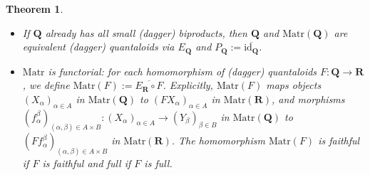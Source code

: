 \documentclass[12pt]{tac}
\newtheorem{theorem}{Theorem}[section]
\theoremstyle{definition}
\theoremstyle{remark}
\newcommand{\<}{\langle}
\renewcommand{\>}{\rangle}
\renewcommand{\:}{\colon}
\newcommand{\id}{\mathrm{id}}
\begin{document}
\begin{theorem}
\begin{itemize}
    the following diagram commutes up to natural isomorphism:
 \[ \begin{tikzcd}
 \mathbf Q\ar{r}{E_\mathbf Q}\ar{dr}[swap]{F} & \mathrm{Matr}(\mathbf Q)\ar{d}{\overline F}
  \\
  & \mathbf R,
\end{tikzcd} \]
 namely the functor that maps any object $(X_\alpha)_{\alpha\in A}$ in $\mathrm{Matr}(\mathbf Q)$ to $\bigoplus_{\alpha\in A}X_\alpha$ in $\mathbf{R}$ and that maps morphisms $(f_\alpha^\beta)_{(\alpha,\beta)\in A\times B}:(X_\alpha)_{\alpha\in A}\to(Y_\beta)_{\beta\in B}$ to $\bigvee_{\alpha\in A,\beta\in B}i_{Y_\beta}\circ f_\alpha^\beta\circ p_{X_\alpha}$.
    \item If $\mathbf Q$ already has all small (dagger) biproducts, then $\mathbf Q$ and $\mathrm{Matr}(\mathbf Q)$ are equivalent (dagger) quantaloids via $E_\mathbf Q$ and $P_{\mathbf Q}:=\overline{\id_{\mathbf Q}}$.
    \item $\mathrm{Matr}$ is functorial: for each homomorphism of (dagger) quantaloids $F:\mathbf Q\to\mathbf R$, we define $\mathrm{Matr}(F):=\overline{E_\mathbf R\circ F}$. Explicitly, $\mathrm{Matr}(F)$ maps objects $(X_\alpha)_{\alpha\in A}$ in $\mathrm{Matr}(\mathbf Q)$ to $(F X_\alpha)_{\alpha\in A}$ in $\mathrm{Matr}(\mathbf R)$, and morphisms $(f_{\alpha}^\beta)_{(\alpha,\beta)\in A\times B}:(X_\alpha)_{\alpha\in A}\to(Y_\beta)_{\beta\in B}$ in $\mathrm{Matr}(\mathbf Q)$ to $(Ff_\alpha^\beta)_{(\alpha,\beta)\in A\times B}$ in $\mathrm{Matr}(\mathbf R)$. The homomorphism $\mathrm{Matr}(F)$ is faithful if $F$ is faithful and full if $F$ is full.
    \end{itemize}
\end{theorem}
\end{document}

